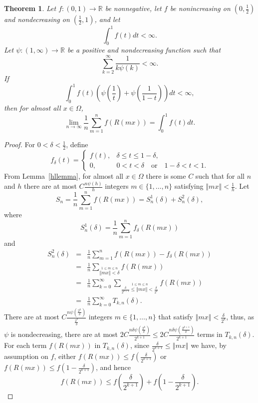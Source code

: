 \documentclass{amsart}
\newcommand{\norm}[1]{\left\Vert #1 \right\Vert}
\newtheorem{theorem}{Theorem}
\begin{document}
\begin{theorem}
Let $f:(0,1) \to \mathbb{R}$ be  nonnegative, let $f$ be nonincreasing on $(0,\frac{1}{2})$ and nondecreasing on $(\frac{1}{2},1)$, and let
\[
\int_0^1 f(t) dt < \infty.
\] 
Let $\psi:(1,\infty) \to \mathbb{R}$ be a positive and nondecreasing function such that
\[
\sum_{k=2}^\infty \frac{1}{k\psi(k)} < \infty.
\]
If
\[
\int_0^1 f(t) \left( \psi\left(\frac{1}{t}\right)+\psi\left(\frac{1}{1-t}\right) \right) dt<\infty,
\]
then for almost all $x \in \Omega$,
\[
\lim_{n \to \infty} \frac{1}{n} \sum_{m=1}^n f(R(mx))= \int_0^1 f(t)dt.
\]
\label{fpsi}
\end{theorem}
\begin{proof}
For $0<\delta<\frac{1}{2}$, define 
\[
f_\delta(t)=\begin{cases}f(t),&\delta\leq t \leq 1-\delta,\\
0,&0<t < \delta \quad \textrm{or} \quad 1-\delta < t<1.
\end{cases}
\]
From Lemma~\ref{hllemma}, for almost all $x \in \Omega$ there is some $C$ such that for all $n$ and $h$ there are at most
$C\frac{n\psi(h)}{h}$ integers $m \in \{1,\ldots,n\}$ satisfying $\norm{mx} < \frac{1}{h}$.
Let
\[
S_n=\frac{1}{n}\sum_{m=1}^n f(R(mx))=S_n^1(\delta)+S_n^2(\delta),
\]
where
\[
S_n^1(\delta)=\frac{1}{n}\sum_{m=1}^n f_\delta(R(mx))
\]
and
\begin{eqnarray*}
S_n^2(\delta)&=&\frac{1}{n}\sum_{m=1}^n f(R(mx))-f_\delta(R(mx))\\
&=&\frac{1}{n}\sum_{\stackrel{1 \leq m \leq n}{\norm{mx} < \delta}} f(R(mx))\\
&=&\frac{1}{n}\sum_{k=0}^\infty \sum_{\stackrel{1 \leq m \leq n}{\frac{\delta}{2^{k+1}} \leq \norm{mx} < \frac{\delta}{2^k}}} f(R(mx))\\
&=&\frac{1}{n} \sum_{k=0}^\infty T_{k,n}(\delta).
\end{eqnarray*}
There are at most $C\frac{n\psi\left( \frac{2^k}{\delta} \right)}{\frac{2^k}{\delta}}$ integers $m \in \{1, \ldots, n\}$ that satisfy 
$\norm{mx} < \frac{\delta}{2^k}$, thus, as $\psi$ is nondecreasing, there are at most $2C\frac{n\delta\psi\left( \frac{2^k}{\delta} \right)}{2^{k+1}} \leq 2C \frac{n\delta \psi\left( \frac{2^{k+1}}{\delta} \right)}{2^{k+1}}$ 
terms in $T_{k,n}(\delta)$. 
For each term $f(R(mx))$ in $T_{k,n}(\delta)$, since $\frac{\delta}{2^{k+1}} \leq \norm{mx}$ we have, by assumption on $f$, either $f(R(mx)) \leq f\left( \frac{\delta}{2^{k+1}} \right)$ or
$f(R(mx)) \leq f\left(1-  \frac{\delta}{2^{k+1}} \right)$, and hence 
\[
f(R(mx)) \leq f\left( \frac{\delta}{2^{k+1}} \right) + f\left(1-  \frac{\delta}{2^{k+1}} \right).
\]
\end{proof}
\end{document}
